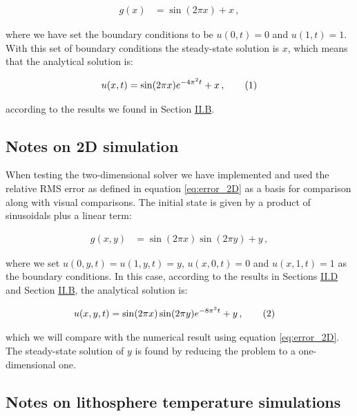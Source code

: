 \documentclass[reprint,english,notitlepage]{revtex4-1}  %
\newcommand\numberthis{\addtocounter{equation}{1}\tag{\theequation}}
\begin{document}
\begin{align*}
g(x) &= \sin ( 2\pi x) + x \, ,
\end{align*}

where we have set the boundary conditions to be $u(0,t) = 0$ and $u(1,t) = 1$. With this set of boundary conditions the steady-state solution is $x$, which means that the analytical solution is:

\begin{align*}
u(x,t) = \sin(2\pi x)e^{-4\pi^2 t} + x \, , \numberthis \label{eq:analytical_1D}
\end{align*} 

according to the results we found in Section \hyperref[sec:formalism_1D_diff_eq_analytical]{II.B}.


\subsection{Notes on 2D simulation} \label{sec:method_2D_sim}

When testing the two-dimensional solver we have implemented and used the relative RMS error as defined in equation \eqref{eq:error_2D} as a basis for comparison along with visual comparisons. The initial state is given by a product of sinusoidals plus a linear term:

\begin{align*}
g(x,y) &= \sin(2\pi x) \sin (2\pi y) + y \, ,
\end{align*}

where we set $u(0,y,t) = u(1,y,t) = y$, $u(x,0,t) = 0$ and $u(x,1,t) = 1$ as the boundary conditions. In this case, according to the results in Sections \hyperref[sec:formalism_2D_diff_eq_analytical]{II.D} and Section \hyperref[sec:formalism_1D_diff_eq_analytical]{II.B}, the analytical solution is:

\begin{align*}
u(x,y,t) &= \sin(2\pi x) \sin(2\pi y) e^{-8\pi^2 t} + y \, , \numberthis \label{eq:analytical_2D}
\end{align*}

which we will compare with the numerical result using equation \eqref{eq:error_2D}. The steady-state solution of $y$ is found by reducing the problem to a one-dimensional one.


\subsection{Notes on lithosphere temperature simulations} \label{sec:method_heat_sim}
\end{document}
